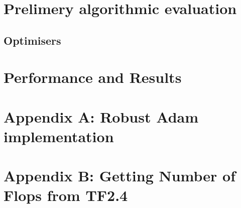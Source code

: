 \documentclass[journal]{IEEEtranTIE}
\begin{document}
\section{Prelimery algorithmic evaluation} \label{sec:Body}

    
    
    \subsection{Optimisers} \label{subsec:optimisers}
    
        
        
        
\section{Performance and Results}\label{sec:results}

% 
%   
\begin{landscape}  


\end{landscape}
% 
% 



%
%
{
\clearpage
\appendices
\section{Appendix A: Robust Adam implementation}  \label{app:RoAdam}

\clearpage
\section{Appendix B: Getting Number of Flops from TF2.4}  \label{app:flops}

}
{}
\end{document}
